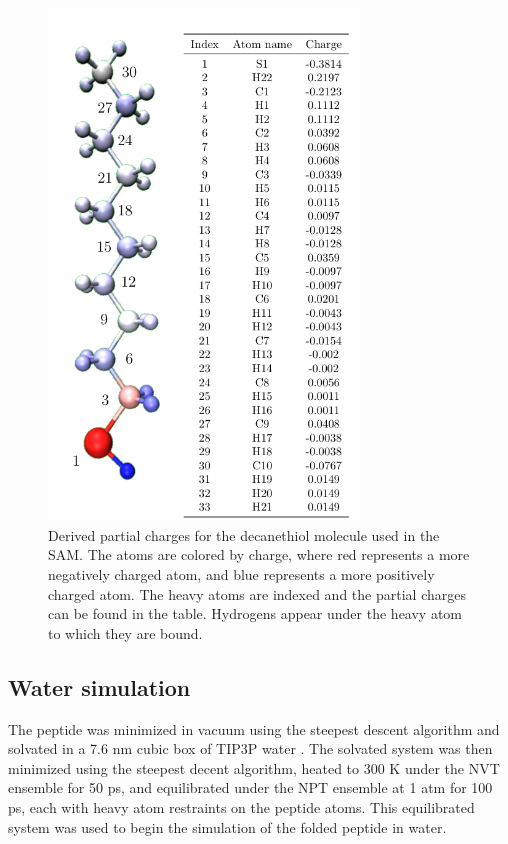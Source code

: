\begin{figure}
    \center
    \includegraphics[width=3.25in]{figures-helix/charge_figure.png}
    \caption{
        Derived partial charges for the decanethiol molecule used in the SAM. 
        The atoms are colored by charge, where red represents a more negatively charged atom, and blue represents a more positively charged atom. 
        The heavy atoms are indexed and the partial charges can be found in the table. 
        Hydrogens appear under the heavy atom to which they are bound.
    }
    \label{fig:helix-charges}
\end{figure}

\subsection{Water simulation}

The peptide was minimized in vacuum using the steepest descent algorithm and solvated in a 7.6 nm cubic box of TIP3P water \cite{Jorgensen1983}. 
The solvated system was then minimized using the steepest decent algorithm, heated to 300 K under the NVT ensemble for 50 ps, and equilibrated under the NPT ensemble at 1 atm for 100 ps, each with heavy atom restraints on the peptide atoms. 
This equilibrated system was used to begin the simulation of the folded peptide in water. 

